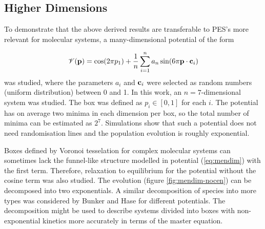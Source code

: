 \subsection{Higher Dimensions}
\label{sec:manydim}

To demonstrate that the above derived results are transferable to PES's more relevant for molecular systems, a many-dimensional potential of the form

\begin{equation}
\label{eq:mendim}
\mathscr{V}({\bf p}) = \cos (2 \pi p_1) + \frac{1}{n} \sum_{i=1}^n a_n \sin (6 \pi {\bf p} \cdot {\bf c}_i) 
\end{equation}
was studied, where the parameters $a_i$ and ${\bf c}_i$ were selected as random numbers (uniform distribution) between 0 and 1.
In this work, an $n=7$-dimensional system was studied.
The box was defined as $p_i \in [0,1]$ for each $i$.
The potential has on average two minima in each dimension per box, so the total number of minima can be estimated as $2^7$.
Simulations show that such a potential does not need randomisation lines and the population evolution is roughly exponential.

Boxes defined by Voronoi tesselation for complex molecular systems can sometimes lack the funnel-like structure modelled in potential (\ref{eq:mendim}) with the first term.
Therefore, relaxation to equilibrium for the potential without the cosine term was also studied.
The evolution (figure \ref{fig:mendim-nocen}) can be decomposed into two exponentials.
A similar decomposition of species into more types was considered by Bunker and \mbox{Hase\cite{Bunker1964, Bunker1973, Hase1983}} for different potentials.
The decomposition might be used to describe systems divided into boxes with non-exponential kinetics more accurately in terms of the master equation.

